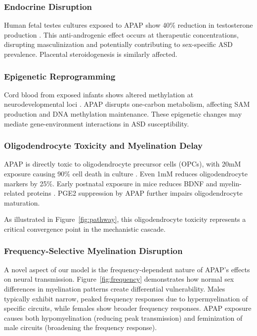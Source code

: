 \documentclass[12pt]{article}
\begin{document}
\subsubsection{Endocrine Disruption}
Human fetal testes cultures exposed to APAP show 40\% reduction in testosterone production \citep{kristensen2016,vanmaldergem2018}. This anti-androgenic effect occurs at therapeutic concentrations, disrupting masculinization and potentially contributing to sex-specific ASD prevalence. Placental steroidogenesis is similarly affected.

\subsubsection{Epigenetic Reprogramming}
Cord blood from exposed infants shows altered methylation at neurodevelopmental loci \citep{ji2020}. APAP disrupts one-carbon metabolism, affecting SAM production and DNA methylation maintenance. These epigenetic changes may mediate gene-environment interactions in ASD susceptibility.

\subsubsection{Oligodendrocyte Toxicity and Myelination Delay}
APAP is directly toxic to oligodendrocyte precursor cells (OPCs), with 20mM exposure causing 90\% cell death in culture \citep{perez2012}. Even 1mM reduces oligodendrocyte markers by 25\%. Early postnatal exposure in mice reduces BDNF and myelin-related proteins \citep{blecharz2018}. PGE2 suppression by APAP further impairs oligodendrocyte maturation.

As illustrated in Figure~\ref{fig:pathway}, this oligodendrocyte toxicity represents a critical convergence point in the mechanistic cascade.

\subsubsection{Frequency-Selective Myelination Disruption}
A novel aspect of our model is the frequency-dependent nature of APAP's effects on neural transmission. Figure~\ref{fig:frequency} demonstrates how normal sex differences in myelination patterns create differential vulnerability. Males typically exhibit narrow, peaked frequency responses due to hypermyelination of specific circuits, while females show broader frequency responses. APAP exposure causes both hypomyelination (reducing peak transmission) and feminization of male circuits (broadening the frequency response).
\end{document}
